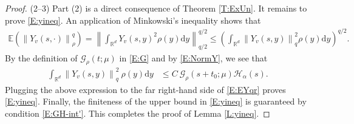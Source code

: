 \documentclass[12pt]{report}
\theoremstyle{plain}
\theoremstyle{definition}
\numberwithin{equation}{section}
\newcommand{\R}{\mathbb{R}}
\newcommand{\E}{\mathbb{E}}
\newcommand{\Norm}[1]{\left\|  #1   \right\|}
\newcommand{\ud}{\ensuremath{ \mathrm{d} }}
\begin{document}
\begin{proof}
	\noindent (2--3) Part (2) is a direct consequence of Theorem \ref{T:ExUn}. It remains to prove
	\eqref{E:yineq}. An application of Minkowski's inequality shows that
	\begin{align} \label{E:EYqr}
	\E\left( \Norm{Y_v(s,\cdot)}_{\rho}^q\right)
	= \Norm{\int_{\R^d} Y_v(s,y)^2\rho(y) \ud y }_{q/2}^{q/2}
	\le \left(\int_{\R^d} \Norm{ Y_v(s,y) }_q^2\rho(y) \ud y \right)^{q/2}.
	\end{align}
	By the definition of $\mathcal{G}_{\rho}(t;\mu)$ in \eqref{E:G} and by \eqref{E:NormY}, we see
	that
	\begin{align*}
	\int_{\R^d}\Norm{Y_v(s,y)}_q^2 \: \rho(y)\ud y
	& \le C \: \mathcal{G}_{\rho}(s + t_0;\mu) \mathcal{H}_\alpha(s).
	\end{align*}
	Plugging the above expression to the far right-hand side of \eqref{E:EYqr} proves \eqref{E:yineq}.
	Finally, the finiteness of the upper bound in \eqref{E:yineq} is guaranteed by condition
	\eqref{E:GH-int'}. This completes the proof of Lemma \ref{L:yineq}.
\end{proof}
\end{document}
